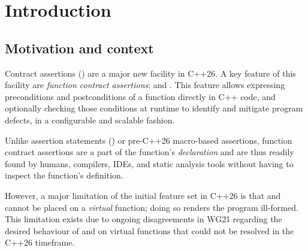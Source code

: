 



\section{Introduction}

\subsection{Motivation and context}

Contract assertions (\cite{P2900R14}) are a major new facility in C++26. A key feature of this facility are \emph{function contract assertions}:  and . This feature allows expressing
preconditions and postconditions of a function directly in C++ code, and optionally checking those conditions at runtime to identify and mitigate program defects, in a configurable and scalable fashion. 

Unlike assertion statements () or pre-C++26 macro-based assertions, function contract assertions are a part of the function's \emph{declaration} and are thus readily found by humans, compilers, IDEs, and static analysis tools without having to inspect the function's definition. 

However, a major limitation of the initial feature set in C++26 is that  and  cannot be placed on a \emph{virtual} function; doing so renders the program ill-formed. This limitation exists due to ongoing disagreements in WG21 regarding the desired behaviour of  and  on virtual functions that could not be resolved in the C++26 timeframe.

